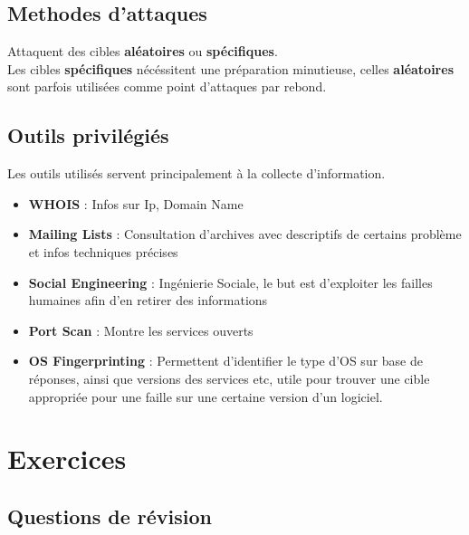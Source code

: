 \documentclass{report}
\begin{document}
		\subsection{Methodes d'attaques}

			Attaquent des cibles \textbf{aléatoires} ou \textbf{spécifiques}.\\

			Les cibles \textbf{spécifiques} nécéssitent une préparation minutieuse, celles \textbf{aléatoires} sont parfois utilisées comme point d'attaques par rebond.\\

		\subsection{Outils privilégiés}

			Les outils utilisés servent principalement à la collecte d'information.\\

			\begin{itemize}
				\item \textbf{WHOIS} : Infos sur Ip, Domain Name
				\item \textbf{Mailing Lists} : Consultation d'archives avec descriptifs de certains problème et infos techniques précises
				\item \textbf{Social Engineering} : Ingénierie Sociale, le but est d'exploiter les failles humaines afin d'en retirer des informations
				\item \textbf{Port Scan} : Montre les services ouverts
				\item \textbf{OS Fingerprinting} : Permettent d'identifier le type d'OS sur base de réponses, ainsi que versions des services etc, utile pour trouver une cible appropriée pour une faille sur une certaine version d'un logiciel.\\
			\end{itemize}

	\section{Exercices}

		\subsection{Questions de révision}
\end{document}
